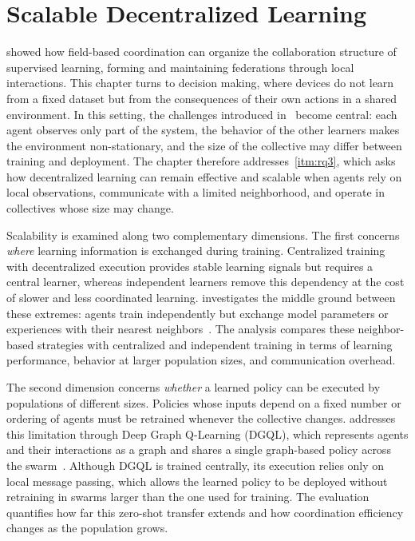 
\chapter{Scalable Decentralized Learning}
\label{chap:scalable-rl}
\minitoc

 showed how field-based coordination can organize
 the collaboration structure of supervised learning,
 forming and maintaining federations through local interactions.
This chapter turns to decision making,
 where devices do not learn from a fixed dataset
 but from the consequences of their own actions in a shared environment.
In this setting,
 the challenges introduced in~ become central:
 each agent observes only part of the system,
 the behavior of the other learners makes the environment non-stationary,
 and the size of the collective may differ between training and deployment.
The chapter therefore addresses~\ref{itm:rq3},
 which asks how decentralized learning can remain effective and scalable
 when agents rely on local observations,
 communicate with a limited neighborhood,
 and operate in collectives whose size may change.

Scalability is examined along two complementary dimensions.
The first concerns \emph{where} learning information is exchanged during training.
Centralized training with decentralized execution provides stable learning signals
 but requires a central learner,
 whereas independent learners remove this dependency
 at the cost of slower and less coordinated learning.
 investigates the middle ground between these extremes:
 agents train independently but exchange model parameters or experiences
 with their nearest neighbors~\cite{DBLP:conf/sac/MalucelliDAV25}.
The analysis compares these neighbor-based strategies with centralized and independent training
 in terms of learning performance, behavior at larger population sizes, and communication overhead.

The second dimension concerns \emph{whether} a learned policy can be executed
 by populations of different sizes.
Policies whose inputs depend on a fixed number or ordering of agents
 must be retrained whenever the collective changes.
 addresses this limitation through Deep Graph Q-Learning (DGQL),
 which represents agents and their interactions as a graph
 and shares a single graph-based policy across the swarm~\cite{DBLP:journals/ai/AguzziDVV26}.
Although DGQL is trained centrally,
 its execution relies only on local message passing,
 which allows the learned policy to be deployed without retraining
 in swarms larger than the one used for training.
The evaluation quantifies how far this zero-shot transfer extends
 and how coordination efficiency changes as the population grows.

